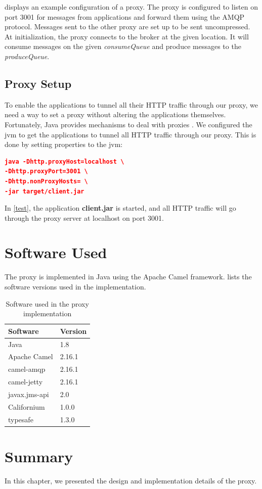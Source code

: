  displays an example configuration of a proxy. The
proxy is configured to listen on port 3001 for messages from applications and
forward them using the AMQP protocol. Messages sent to the other proxy are set
up to be sent uncompressed. At initialization, the proxy connects to the broker
at the given location. It will consume messages on the given
\textit{consumeQueue} and produce messages to the \textit{produceQueue}.





\subsection{Proxy Setup}

To enable the applications to tunnel all their HTTP traffic through our
proxy, we need a way to set a proxy without altering the applications
themselves. Fortunately, Java provides mechanisms to deal with proxies
\cite{oracle-proxy}. We configured the \gls{jvm} to get the applications to
tunnel all HTTP traffic through our proxy. This is done by setting properties to
the \gls{jvm}:


\begin{lstlisting}[frame=single, language=json, caption="Setting a proxy on the \gls{jvm}", label=test]
java -Dhttp.proxyHost=localhost \
-Dhttp.proxyPort=3001 \
-Dhttp.nonProxyHosts= \
-jar target/client.jar
\end{lstlisting}

In \cref{test}, the application \textbf{client.jar} is started, and all HTTP
traffic will go through the proxy server at localhost on port 3001.


\section{Software Used}

The proxy is implemented in Java using the Apache Camel framework.
 lists the software versions used in the
implementation.

\begin{table}[h]
\begin{tabularx}{0.5\textwidth}{|X|X|}
\hline
\textbf{Software} & \textbf{Version} \\ \hline
Java            & 1.8           \\ \hline
Apache Camel     & 2.16.1           \\ \hline
camel-amqp      & 2.16.1            \\ \hline
camel-jetty      & 2.16.1            \\ \hline
javax.jms-api      & 2.0            \\ \hline
Californium      & 1.0.0            \\ \hline
typesafe      & 1.3.0            \\ \hline
\end{tabularx}
\caption{Software used in the proxy implementation}
\label{table:implementation-versions}
\end{table}

\section{Summary}

In this chapter, we presented the design and implementation details of the proxy.
